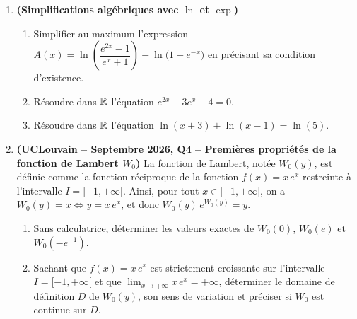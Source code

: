 \begin{enumerate}[label=\textbf{Exercice 1.\arabic* --}]
    \item \textbf{(Simplifications algébriques avec $\ln$ et $\exp$)}
    \begin{enumerate}
        \item Simplifier au maximum l'expression $A(x) = \ln\left(\dfrac{e^{2x} - 1}{e^x + 1}\right) - \ln\bigl(1 - e^{-x}\bigr)$ en précisant sa condition d'existence.
        \item Résoudre dans $\mathbb{R}$ l'équation $e^{2x} - 3e^x - 4 = 0$.
        \item Résoudre dans $\mathbb{R}$ l'équation $\ln(x+3) + \ln(x-1) = \ln(5)$.
    \end{enumerate}

    \item \textbf{(UCLouvain -- Septembre 2026, Q4 -- Premières propriétés de la fonction de Lambert $W_0$)}
    La fonction de Lambert, notée $W_0(y)$, est définie comme la fonction réciproque de la fonction $f(x) = x\,e^x$ restreinte à l'intervalle $I = [-1, +\infty[$. Ainsi, pour tout $x \in [-1, +\infty[$, on a $W_0(y) = x \iff y = x\,e^x$, et donc $W_0(y)\,e^{W_0(y)} = y$.
    \begin{enumerate}
        \item Sans calculatrice, déterminer les valeurs exactes de $W_0(0)$, $W_0(e)$ et $W_0(-e^{-1})$.
        \item Sachant que $f(x) = x\,e^x$ est strictement croissante sur l'intervalle $I = [-1, +\infty[$ et que $\lim_{x \to +\infty} x\,e^x = +\infty$, déterminer le domaine de définition $D$ de $W_0(y)$, son sens de variation et préciser si $W_0$ est continue sur $D$.
    \end{enumerate}
\end{enumerate}
